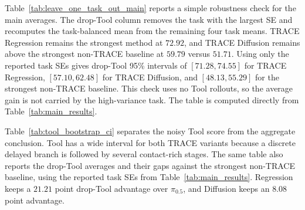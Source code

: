 \documentclass{article}
\begin{document}
Table~\ref{tab:leave_one_task_out_main} reports a simple robustness check for the main averages. The drop-Tool column removes the task with the largest SE and recomputes the task-balanced mean from the remaining four task means. TRACE Regression remains the strongest method at $72.92$, and TRACE Diffusion remains above the strongest non-TRACE baseline at $59.79$ versus $51.71$. Using only the reported task SEs gives drop-Tool 95\% intervals of $[71.28,74.55]$ for TRACE Regression, $[57.10,62.48]$ for TRACE Diffusion, and $[48.13,55.29]$ for the strongest non-TRACE baseline. This check uses no Tool rollouts, so the average gain is not carried by the high-variance task. The table is computed directly from Table~\ref{tab:main_results}.

\begin{table}[H]
    \centering
    \caption{Leave-one-task-out task-balanced averages for the main comparison. Values are recomputed from the task means in Table~\ref{tab:main_results}.}
    \label{tab:leave_one_task_out_main}
    \setlength{\tabcolsep}{2.4pt}
    \renewcommand{\arraystretch}{1.05}
\end{table}

Table~\ref{tab:tool_bootstrap_ci} separates the noisy Tool score from the aggregate conclusion. Tool has a wide interval for both TRACE variants because a discrete delayed branch is followed by several contact-rich stages. The same table also reports the drop-Tool averages and their gaps against the strongest non-TRACE baseline, using the reported task SEs from Table~\ref{tab:main_results}. Regression keeps a $21.21$ point drop-Tool advantage over $\pi_{0.5}$, and Diffusion keeps an $8.08$ point advantage.
\end{document}
